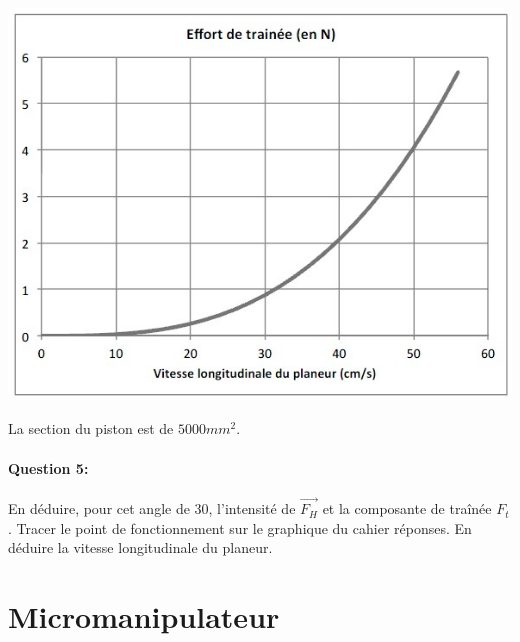 \begin{minipage}{0.38\linewidth}
{\centering\includegraphics[width=0.9\linewidth]{img/plan_Q5.jpg}}
\end{minipage}
\hfill
\begin{minipage}{0.6\linewidth}
La section du piston est de $5 000 mm^2$.

\paragraph{Question 5:} En déduire, pour cet angle de 30\textdegree, l'intensité de $\overrightarrow{F_H}$ et la composante de traînée $F_t$. Tracer le point de fonctionnement sur le graphique du cahier réponses. En déduire la vitesse longitudinale du planeur.
\end{minipage}

\newpage

\section{Micromanipulateur}

